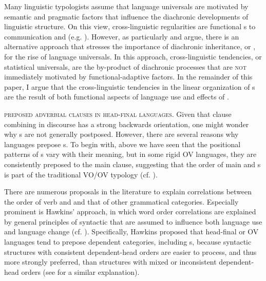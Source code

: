 \documentclass[output=paper]{langsci/langscibook}
\begin{document}
Many linguistic typologists assume that language universals are motivated by semantic and pragmatic factors that influence the diachronic developments of linguistic structure. On this view, cross-linguistic regularities are functional s to communication and  (e.g. \citealt{FoleyVanValin1984,Dik1989,Hawkins2004}). However, as particularly  and  argue, there is an alternative approach that stresses the importance of diachronic inheritance, or , for the rise of language universals. In this approach, cross-linguistic tendencies, or statistical universals, are the by-product of diachronic processes that are \textsc{not} immediately motivated by functional-adaptive factors. In the remainder of this paper, I argue that the cross-linguistic tendencies in the linear organization of s are the result of both functional aspects of language use and  effects of . 

\textsc{preposed} \textsc{adverbial} \textsc{clauses} \textsc{in} \textsc{head-final} \textsc{languages}. Given that clause combining in discourse has a strong backwards orientation, one might wonder why s are not generally postposed. However, there are several reasons why languages prepose s. To begin with, above we have seen that the positional patterns of s vary with their meaning, but in some rigid OV languages, they are consistently preposed to the main clause, suggesting that the order of main and s is part of the traditional VO/OV typology (cf. \citealt{Diessel2001}).

There are numerous proposals in the literature to explain correlations between the order of verb and  and that of other grammatical categories. Especially prominent is Hawkins’  approach, in which word order correlations are explained by general principles of syntactic  that are assumed to influence both language use and language change (cf. \citealt{Hawkins1994, Hawkins2004}). Specifically, Hawkins proposed that head-final or OV languages tend to prepose dependent categories, including s, because syntactic structures with consistent dependent-head orders are easier to process, and thus more strongly preferred, than structures with mixed or inconsistent dependent-head orders (see \citealt{Dryer1992} for a similar explanation).
\end{document}
